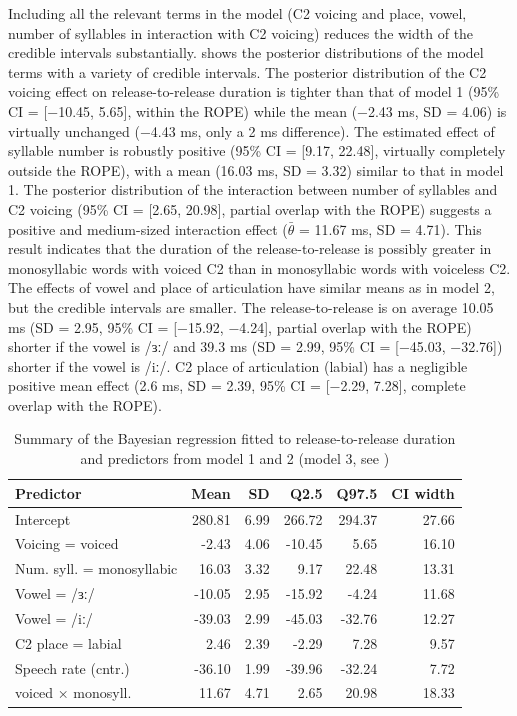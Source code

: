 \documentclass[12pt,a4paper,]{article}
\begin{document}
Including all the relevant terms in the model (C2 voicing and place,
vowel, number of syllables in interaction with C2 voicing) reduces the
width of the credible intervals substantially.  shows
the posterior distributions of the model terms with a variety of
credible intervals. The posterior distribution of the C2 voicing effect
on release-to-release duration is tighter than that of model 1 (95\% CI
= {[}−10.45, 5.65{]}, within the ROPE) while the mean (−2.43 ms, SD =
4.06) is virtually unchanged (−4.43 ms, only a 2 ms difference). The
estimated effect of syllable number is robustly positive (95\% CI =
{[}9.17, 22.48{]}, virtually completely outside the ROPE), with a mean
(16.03 ms, SD = 3.32) similar to that in model 1. The posterior
distribution of the interaction between number of syllables and C2
voicing (95\% CI = {[}2.65, 20.98{]}, partial overlap with the ROPE)
suggests a positive and medium-sized interaction effect
(\(\bar{\theta}\) = 11.67 ms, SD = 4.71). This result indicates that the
duration of the release-to-release is possibly greater in monosyllabic
words with voiced C2 than in monosyllabic words with voiceless C2. The
effects of vowel and place of articulation have similar means as in
model 2, but the credible intervals are smaller. The release-to-release
is on average 10.05 ms (SD = 2.95, 95\% CI = {[}−15.92, −4.24{]},
partial overlap with the ROPE) shorter if the vowel is /ɜː/ and 39.3 ms
(SD = 2.99, 95\% CI = {[}−45.03, −32.76{]}) shorter if the vowel is
/iː/. C2 place of articulation (labial) has a negligible positive mean
effect (2.6 ms, SD = 2.39, 95\% CI = {[}−2.29, 7.28{]}, complete overlap
with the ROPE).

\begin{table}

\caption{\label{tab:rr-3-table}Summary of the Bayesian regression fitted to release-to-release duration and predictors from model 1 and 2 (model 3, see )}
\centering
\fontsize{8}{10}\selectfont
\begin{tabular}[t]{lrrrrr}
\toprule
Predictor & Mean & SD & Q2.5 & Q97.5 & CI width\\
\midrule
Intercept & 280.81 & 6.99 & 266.72 & 294.37 & 27.66\\
Voicing = voiced & -2.43 & 4.06 & -10.45 & 5.65 & 16.10\\
Num. syll. = monosyllabic & 16.03 & 3.32 & 9.17 & 22.48 & 13.31\\
Vowel = /ɜː/ & -10.05 & 2.95 & -15.92 & -4.24 & 11.68\\
Vowel = /iː/ & -39.03 & 2.99 & -45.03 & -32.76 & 12.27\\
C2 place = labial & 2.46 & 2.39 & -2.29 & 7.28 & 9.57\\
Speech rate (cntr.) & -36.10 & 1.99 & -39.96 & -32.24 & 7.72\\
voiced × monosyll. & 11.67 & 4.71 & 2.65 & 20.98 & 18.33\\
\bottomrule
\end{tabular}
\end{table}
\end{document}
